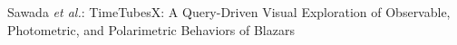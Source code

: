 \documentclass[10pt,journal,compsoc]{IEEEtran}
\begin{document}

% 
%



%
{Sawada \MakeLowercase{\textit{et al.}}: TimeTubesX: A Query-Driven Visual Exploration of Observable, Photometric, and Polarimetric Behaviors of Blazars}
% 
\end{document}
